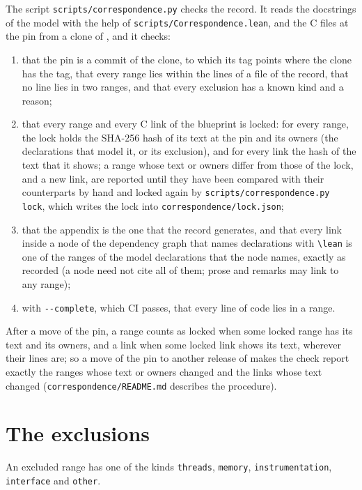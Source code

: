 The script \verb|scripts/correspondence.py| checks the record. It reads the docstrings of the model
with the help of \verb|scripts/Correspondence.lean|, and the C files at the pin from a clone of
\ratpoints{}, and it checks:
\begin{enumerate}
  \item that the pin is a commit of the clone, to which its tag points where the clone has the tag,
    that every range lies within the lines of a file of the record, that no line lies in two ranges,
    and that every exclusion has a known kind and a reason;
  \item that every range and every C link of the blueprint is locked: for every range, the lock
    holds the SHA-256 hash of its text at the pin and its owners (the declarations that model it, or
    its exclusion), and for every link the hash of the text that it shows; a range whose text or
    owners differ from those of the lock, and a new link, are reported until they have been compared
    with their counterparts by hand and locked again by \verb|scripts/correspondence.py lock|, which
    writes the lock into \verb|correspondence/lock.json|;
  \item that the appendix is the one that the record generates, and that every link inside a node
    of the dependency graph that names declarations with \verb|\lean| is one of the ranges of the
    model declarations that the node names, exactly as recorded (a node need not cite all of
    them; prose and remarks may link to any range);
  \item with \verb|--complete|, which CI passes, that every line of code lies in a range.
\end{enumerate}
After a move of the pin, a range counts as locked when some locked range has its text and its
owners, and a link when some locked link shows its text, wherever their lines are; so a move of the
pin to another release of \ratpoints{} makes the check report exactly the ranges whose text or owners
changed and the links whose text changed (\verb|correspondence/README.md| describes the procedure).

\section{The exclusions}\label{sec:ccodeExclusions}

An excluded range has one of the kinds \verb|threads|, \verb|memory|, \verb|instrumentation|,
\verb|interface| and \verb|other|.

